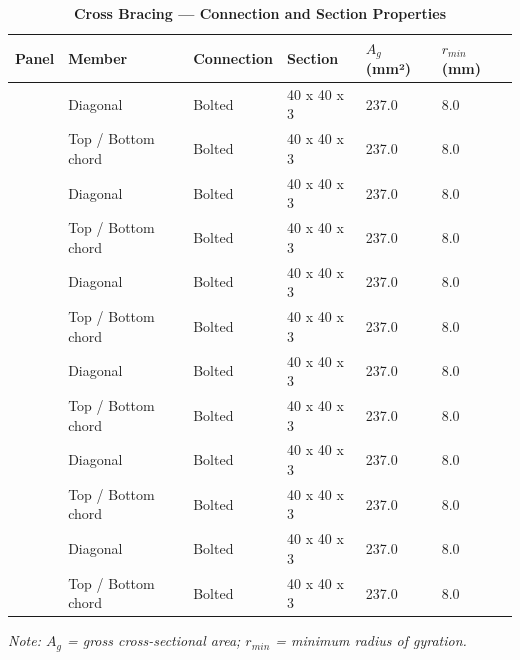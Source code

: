 \documentclass[12pt,a4paper]{report}
\numberwithin{table}{chapter}
\numberwithin{figure}{chapter}
\begin{document}
\vspace{1em}

\vspace{0.4em}
\noindent
\setlength{\tabcolsep}{4pt}
\setlength\LTleft{0pt}
\setlength\LTright{\fill}

\begin{longtable}{|C{2.0cm}|L{2.0cm}|L{2.2cm}|C{2.5cm}|C{2.0cm}|C{2.0cm}|}
\caption{\textbf{Cross Bracing --- Connection and Section Properties}}
\hline
\textbf{Panel} & \textbf{Member} & \textbf{Connection} & \textbf{Section} & \textbf{$A_g$ (mm²)} & \textbf{$r_{min}$ (mm)} \\[6pt]
\hline
{} & Diagonal & Bolted & 40 x 40 x 3 & 237.0 & 8.0 \\[6pt]
 & Top / Bottom chord & Bolted & 40 x 40 x 3 & 237.0 & 8.0 \\[6pt]
\hline
{} & Diagonal & Bolted & 40 x 40 x 3 & 237.0 & 8.0 \\[6pt]
 & Top / Bottom chord & Bolted & 40 x 40 x 3 & 237.0 & 8.0 \\[6pt]
\hline
{} & Diagonal & Bolted & 40 x 40 x 3 & 237.0 & 8.0 \\[6pt]
 & Top / Bottom chord & Bolted & 40 x 40 x 3 & 237.0 & 8.0 \\[6pt]
\hline
{} & Diagonal & Bolted & 40 x 40 x 3 & 237.0 & 8.0 \\[6pt]
 & Top / Bottom chord & Bolted & 40 x 40 x 3 & 237.0 & 8.0 \\[6pt]
\hline
{} & Diagonal & Bolted & 40 x 40 x 3 & 237.0 & 8.0 \\[6pt]
 & Top / Bottom chord & Bolted & 40 x 40 x 3 & 237.0 & 8.0 \\[6pt]
\hline
{} & Diagonal & Bolted & 40 x 40 x 3 & 237.0 & 8.0 \\[6pt]
 & Top / Bottom chord & Bolted & 40 x 40 x 3 & 237.0 & 8.0 \\[6pt]
\hline
\end{longtable}
\noindent\textit{Note: $A_g$ = gross cross-sectional area; $r_{min}$ = minimum radius of gyration.}
\end{document}
